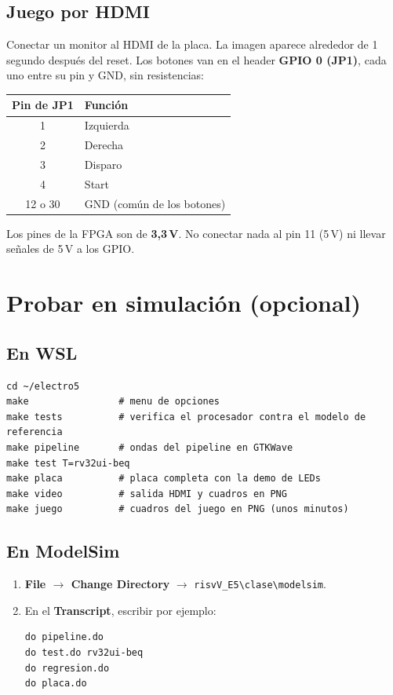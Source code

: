 \documentclass[11pt,a4paper]{article}
\newcommand{\code}[1]{\texttt{#1}}
\newcommand{\menu}[1]{\textsf{\textbf{#1}}}
\begin{document}
\subsection{Juego por HDMI}

Conectar un monitor al HDMI de la placa. La imagen aparece alrededor de 1 segundo después del reset. Los botones van en el header \textbf{GPIO 0 (JP1)}, cada uno entre su pin y GND, sin resistencias:

\begin{center}
\begin{tabular}{cl}
\toprule
Pin de JP1 & Función \\
\midrule
1 & Izquierda \\
2 & Derecha \\
3 & Disparo \\
4 & Start \\
12 o 30 & GND (común de los botones) \\
\bottomrule
\end{tabular}
\end{center}

Los pines de la FPGA son de \textbf{3,3\,V}. No conectar nada al pin 11 (5\,V) ni llevar señales de 5\,V a los GPIO.

\section{Probar en simulación (opcional)}

\subsection{En WSL}
\begin{lstlisting}
cd ~/electro5
make                # menu de opciones
make tests          # verifica el procesador contra el modelo de referencia
make pipeline       # ondas del pipeline en GTKWave
make test T=rv32ui-beq
make placa          # placa completa con la demo de LEDs
make video          # salida HDMI y cuadros en PNG
make juego          # cuadros del juego en PNG (unos minutos)
\end{lstlisting}

\subsection{En ModelSim}
\begin{enumerate}
\item \menu{File $\to$ Change Directory} $\to$ \code{risvV\_E5\textbackslash clase\textbackslash modelsim}.
\item En el \menu{Transcript}, escribir por ejemplo:
\begin{lstlisting}
do pipeline.do
do test.do rv32ui-beq
do regresion.do
do placa.do
\end{lstlisting}
\end{enumerate}
\end{document}
